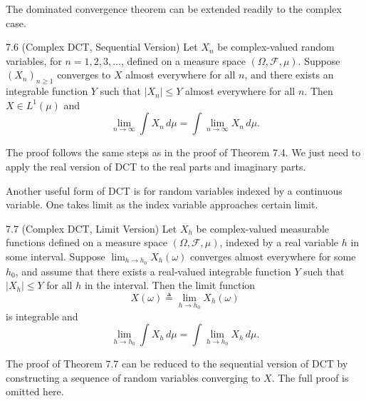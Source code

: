 The dominated convergence theorem can be extended readily to the complex case.

\begin{thmbox}{7.6 (Complex DCT, Sequential Version)}
Let $X_n$ be complex-valued random variables, for $n=1,2,3,\dots$, defined on a measure space $(\Omega,\mathcal{F},\mu)$. Suppose $(X_n)_{n\ge 1}$ converges to $X$ almost everywhere for all $n$, and there exists an integrable function $Y$ such that $|X_n|\le Y$ almost everywhere for all $n$. Then $X\in L^1(\mu)$ and
\[
\lim_{n\to\infty} \int X_n\, d\mu = \int \lim_{n\to\infty} X_n\, d\mu.
\]
\end{thmbox}

The proof follows the same steps as in the proof of Theorem 7.4. We just need to apply the real version of DCT to the real parts and imaginary parts.

Another useful form of DCT is for random variables indexed by a continuous variable. One takes limit as the index variable approaches certain limit.

\begin{thmbox}{7.7 (Complex DCT, Limit Version)}
Let $X_h$ be complex-valued measurable functions defined on a measure space $(\Omega,\mathcal{F},\mu)$, indexed by a real variable $h$ in some interval. Suppose $\lim_{h\to h_0} X_h(\omega)$ converges almost everywhere for some $h_0$, and assume that there exists a real-valued integrable function $Y$ such that $|X_h|\le Y$ for all $h$ in the interval. Then the limit function
\[
X(\omega)\triangleq \lim_{h\to h_0} X_h(\omega)
\]
is integrable and
\[
\lim_{h\to h_0} \int X_h\, d\mu = \int \lim_{h\to h_0} X_h\, d\mu.
\]
\end{thmbox}

The proof of Theorem 7.7 can be reduced to the sequential version of DCT by constructing a sequence of random variables converging to $X$. The full proof is omitted here.
